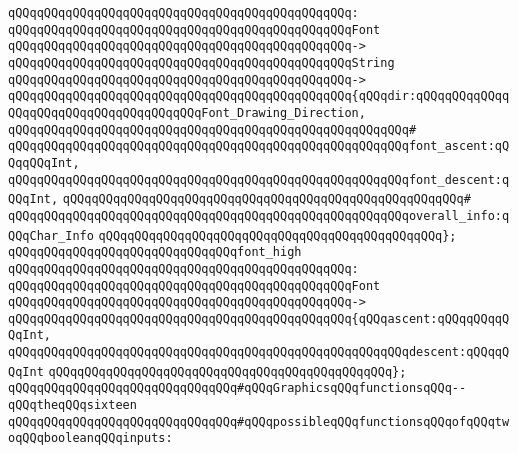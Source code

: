 \verb|qQQqqQQqqQQqqQQqqQQqqQQqqQQqqQQqqQQqqQQqqQQqqQQq:|\newline
\verb|qQQqqQQqqQQqqQQqqQQqqQQqqQQqqQQqqQQqqQQqqQQqqQQqFont|\newline
\verb|qQQqqQQqqQQqqQQqqQQqqQQqqQQqqQQqqQQqqQQqqQQqqQQq->|\newline
\verb|qQQqqQQqqQQqqQQqqQQqqQQqqQQqqQQqqQQqqQQqqQQqqQQqString|\newline
\verb|qQQqqQQqqQQqqQQqqQQqqQQqqQQqqQQqqQQqqQQqqQQqqQQq->|\newline
\verb|qQQqqQQqqQQqqQQqqQQqqQQqqQQqqQQqqQQqqQQqqQQqqQQq{qQQqdir:qQQqqQQqqQQqqQQqqQQqqQQqqQQqqQQqqQQqqQQqFont_Drawing_Direction,|\newline
\verb|qQQqqQQqqQQqqQQqqQQqqQQqqQQqqQQqqQQqqQQqqQQqqQQqqQQqqQQq#|\newline
\verb|qQQqqQQqqQQqqQQqqQQqqQQqqQQqqQQqqQQqqQQqqQQqqQQqqQQqqQQqfont_ascent:qQQqqQQqInt,|\newline
\verb|qQQqqQQqqQQqqQQqqQQqqQQqqQQqqQQqqQQqqQQqqQQqqQQqqQQqqQQqfont_descent:qQQqInt,|\newline
\verb|qQQqqQQqqQQqqQQqqQQqqQQqqQQqqQQqqQQqqQQqqQQqqQQqqQQqqQQq#|\newline
\verb|qQQqqQQqqQQqqQQqqQQqqQQqqQQqqQQqqQQqqQQqqQQqqQQqqQQqqQQqoverall_info:qQQqChar_Info|\newline
\verb|qQQqqQQqqQQqqQQqqQQqqQQqqQQqqQQqqQQqqQQqqQQqqQQq};|\newline
\newline
\verb|qQQqqQQqqQQqqQQqqQQqqQQqqQQqqQQqfont_high|\newline
\verb|qQQqqQQqqQQqqQQqqQQqqQQqqQQqqQQqqQQqqQQqqQQqqQQq:|\newline
\verb|qQQqqQQqqQQqqQQqqQQqqQQqqQQqqQQqqQQqqQQqqQQqqQQqFont|\newline
\verb|qQQqqQQqqQQqqQQqqQQqqQQqqQQqqQQqqQQqqQQqqQQqqQQq->|\newline
\verb|qQQqqQQqqQQqqQQqqQQqqQQqqQQqqQQqqQQqqQQqqQQqqQQq{qQQqascent:qQQqqQQqqQQqInt,|\newline
\verb|qQQqqQQqqQQqqQQqqQQqqQQqqQQqqQQqqQQqqQQqqQQqqQQqqQQqqQQqdescent:qQQqqQQqInt|\newline
\verb|qQQqqQQqqQQqqQQqqQQqqQQqqQQqqQQqqQQqqQQqqQQqqQQq};|\newline
\newline
\verb|qQQqqQQqqQQqqQQqqQQqqQQqqQQqqQQq#qQQqGraphicsqQQqfunctionsqQQq--qQQqtheqQQqsixteen|\newline
\verb|qQQqqQQqqQQqqQQqqQQqqQQqqQQqqQQq#qQQqpossibleqQQqfunctionsqQQqofqQQqtwoqQQqbooleanqQQqinputs:|\newline
